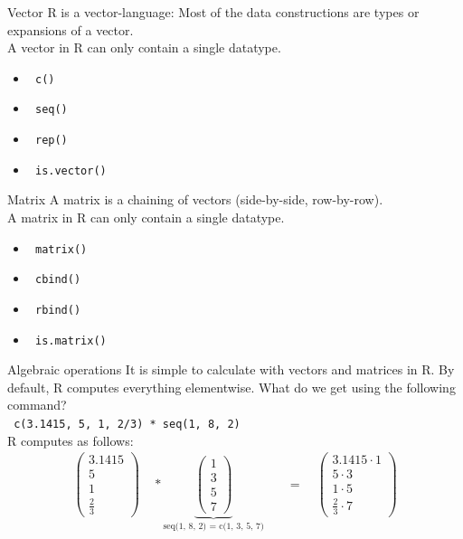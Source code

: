 \documentclass[xcolor=dvipsnames, aspectratio = 169]{beamer}
\begin{document}
\begin{frame}[fragile]{Vector}
	R is a vector-language: Most of the data constructions are types or expansions of a vector.\\
	A vector in R can only contain a single datatype.
	\begin{itemize}
		\item \verb+ c()+
		\item \verb+ seq()+
		\item \verb+ rep()+
		\item \verb+ is.vector()+
	\end{itemize}
\end{frame}

\begin{frame}[fragile]{Matrix}
	A matrix is a chaining of vectors (side-by-side, row-by-row).\\
	A matrix in R can only contain a single datatype.
	\begin{itemize}
		\item \verb+ matrix()+
		\item \verb+ cbind()+
		\item \verb+ rbind()+
		\item \verb+ is.matrix()+
	\end{itemize}
\end{frame}

\begin{frame}[fragile]{Algebraic operations}
It is simple to calculate with vectors and matrices in R. By default, R computes everything elementwise. What do we get using the following command?\\
\verb+ c(3.1415, 5, 1, 2/3) * seq(1, 8, 2)+ \\
R computes as follows: \begin{align*}
	\begin{pmatrix}
	3.1415 \\ 5 \\ 1 \\ \frac{2}{3}
	\end{pmatrix} \quad * 
	\underbrace{\begin{pmatrix}
		1 \\ 3 \\ 5 \\ 7
	\end{pmatrix}}_{\text{seq(1, 8, 2) = c(1, 3, 5, 7)}}
	\quad &= \quad \begin{pmatrix}
	3.1415 \cdot 1 \\
	5 \cdot 3 \\
	1 \cdot 5 \\
	\frac{2}{3} \cdot 7
	\end{pmatrix}
\end{align*}
\end{frame}
\end{document}
